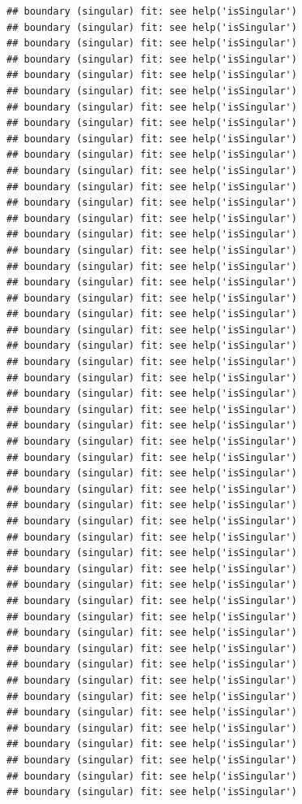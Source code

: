 \documentclass[
  12pt,
]{krantz}
\theoremstyle{definition}
\theoremstyle{definition}
\theoremstyle{definition}
\theoremstyle{definition}
\theoremstyle{remark}
\begin{document}
\begin{verbatim}
## boundary (singular) fit: see help('isSingular')
## boundary (singular) fit: see help('isSingular')
## boundary (singular) fit: see help('isSingular')
## boundary (singular) fit: see help('isSingular')
## boundary (singular) fit: see help('isSingular')
## boundary (singular) fit: see help('isSingular')
## boundary (singular) fit: see help('isSingular')
## boundary (singular) fit: see help('isSingular')
## boundary (singular) fit: see help('isSingular')
## boundary (singular) fit: see help('isSingular')
## boundary (singular) fit: see help('isSingular')
## boundary (singular) fit: see help('isSingular')
## boundary (singular) fit: see help('isSingular')
## boundary (singular) fit: see help('isSingular')
## boundary (singular) fit: see help('isSingular')
## boundary (singular) fit: see help('isSingular')
## boundary (singular) fit: see help('isSingular')
## boundary (singular) fit: see help('isSingular')
## boundary (singular) fit: see help('isSingular')
## boundary (singular) fit: see help('isSingular')
## boundary (singular) fit: see help('isSingular')
## boundary (singular) fit: see help('isSingular')
## boundary (singular) fit: see help('isSingular')
## boundary (singular) fit: see help('isSingular')
## boundary (singular) fit: see help('isSingular')
## boundary (singular) fit: see help('isSingular')
## boundary (singular) fit: see help('isSingular')
## boundary (singular) fit: see help('isSingular')
## boundary (singular) fit: see help('isSingular')
## boundary (singular) fit: see help('isSingular')
## boundary (singular) fit: see help('isSingular')
## boundary (singular) fit: see help('isSingular')
## boundary (singular) fit: see help('isSingular')
## boundary (singular) fit: see help('isSingular')
## boundary (singular) fit: see help('isSingular')
## boundary (singular) fit: see help('isSingular')
## boundary (singular) fit: see help('isSingular')
## boundary (singular) fit: see help('isSingular')
## boundary (singular) fit: see help('isSingular')
## boundary (singular) fit: see help('isSingular')
## boundary (singular) fit: see help('isSingular')
## boundary (singular) fit: see help('isSingular')
## boundary (singular) fit: see help('isSingular')
## boundary (singular) fit: see help('isSingular')
## boundary (singular) fit: see help('isSingular')
## boundary (singular) fit: see help('isSingular')
## boundary (singular) fit: see help('isSingular')
## boundary (singular) fit: see help('isSingular')
## boundary (singular) fit: see help('isSingular')
## boundary (singular) fit: see help('isSingular')
\end{verbatim}
\end{document}
